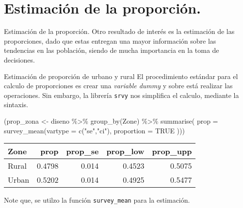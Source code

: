 \documentclass[
  ignorenonframetext,
]{beamer}
\newenvironment{Shaded}{\begin{snugshade}}{\end{snugshade}}
\newcommand{\AttributeTok}[1]{\textcolor[rgb]{0.77,0.63,0.00}{#1}}
\newcommand{\ConstantTok}[1]{\textcolor[rgb]{0.00,0.00,0.00}{#1}}
\newcommand{\FunctionTok}[1]{\textcolor[rgb]{0.00,0.00,0.00}{#1}}
\newcommand{\NormalTok}[1]{#1}
\newcommand{\OtherTok}[1]{\textcolor[rgb]{0.56,0.35,0.01}{#1}}
\newcommand{\SpecialCharTok}[1]{\textcolor[rgb]{0.00,0.00,0.00}{#1}}
\newcommand{\StringTok}[1]{\textcolor[rgb]{0.31,0.60,0.02}{#1}}
\begin{document}
\hypertarget{estimaciuxf3n-de-la-proporciuxf3n.}{%
\section{Estimación de la
proporción.}\label{estimaciuxf3n-de-la-proporciuxf3n.}}

\begin{frame}{Estimación de la proporción.}
Otro resultado de interés es la estimación de las proporciones, dado que
estas entregan una mayor información sobre las tendencias en las
población, siendo de mucha importancia en la toma de decisiones.
\end{frame}

\begin{frame}[fragile]{Estimación de proporción de urbano y rural}
\protect\hypertarget{estimaciuxf3n-de-proporciuxf3n-de-urbano-y-rural}{}
El procedimiento estándar para el calculo de proporciones es crear una
\emph{variable dummy} y sobre está realizar las operaciones. Sin
embargo, la librería \texttt{srvy} nos simplifica el calculo, mediante
la sintaxis.

\begin{Shaded}
\begin{Highlighting}[]
\NormalTok{(prop\_zona }\OtherTok{\textless{}{-}}\NormalTok{ diseno }\SpecialCharTok{\%\textgreater{}\%} \FunctionTok{group\_by}\NormalTok{(Zone) }\SpecialCharTok{\%\textgreater{}\%} 
   \FunctionTok{summarise}\NormalTok{(}
     \AttributeTok{prop =} \FunctionTok{survey\_mean}\NormalTok{(}\AttributeTok{vartype =} \FunctionTok{c}\NormalTok{(}\StringTok{"se"}\NormalTok{,}\StringTok{"ci"}\NormalTok{), }
                        \AttributeTok{proportion =} \ConstantTok{TRUE}\NormalTok{ )))}
\end{Highlighting}
\end{Shaded}

\begin{longtable}[]{@{}lrrrr@{}}
\toprule
Zone & prop & prop\_se & prop\_low & prop\_upp \\
\midrule
\endhead
Rural & 0.4798 & 0.014 & 0.4523 & 0.5075 \\
Urban & 0.5202 & 0.014 & 0.4925 & 0.5477 \\
\bottomrule
\end{longtable}

Note que, se utilzo la función \texttt{survey\_mean} para la estimación.
\end{frame}
\end{document}
